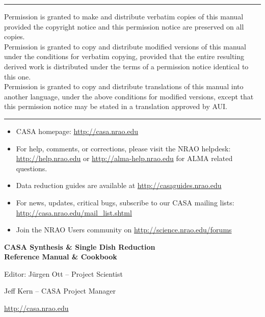 \pagestyle{empty}

\small
\hrule
\vspace{2mm}
\noindent Permission is granted to make and distribute verbatim
copies of this manual provided the copyright notice and this
permission notice are preserved on all copies. \\
\noindent Permission is granted to copy and distribute modified versions of this
manual under the conditions for verbatim copying, provided that the
entire resulting derived work is distributed under the terms of a
permission notice identical to this one. \\
\noindent Permission is granted to copy and distribute translations of
this manual into another language, under the above conditions for
modified versions, except that this permission notice may be stated in
a translation approved by AUI.\\
\hrule
\vspace{2mm}
\normalsize
\vfill
\begin{itemize}
\item CASA homepage: \url{http://casa.nrao.edu}
\item For help, comments, or corrections, please visit the NRAO
helpdesk: \url{http://help.nrao.edu} or
\url{http://alma-help.nrao.edu} for ALMA related questions.
\item Data reduction guides are available at \url{http://casaguides.nrao.edu}
\item For news, updates, critical bugs, subscribe to our CASA mailing lists: \url{http://casa.nrao.edu/mail_list.shtml} 
\item Join the NRAO Users community on \url{http://science.nrao.edu/forums}
\end{itemize}
\normalsize

\pagebreak


\begin{center}
\LARGE
{\bf CASA Synthesis \& Single Dish Reduction\\ Reference Manual \& Cookbook} 

\vspace{3cm}



\Large
{Editor: J\"urgen Ott -- Project Scientist}

\vspace{1cm}

{Jeff Kern -- CASA Project Manager}

\normalsize
\vspace{3cm}
{\Large \url{http://casa.nrao.edu}}\\
\vspace{2cm}
\end{center}
\vfill

